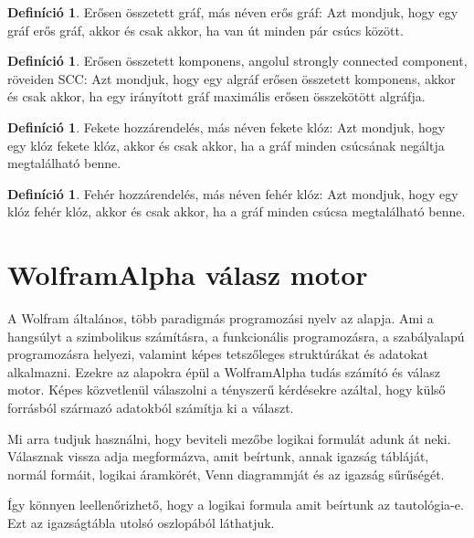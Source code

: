 \documentclass[
]{thesis-ekf}
\theoremstyle{definition}
\newtheorem{definicio}[tetel]{Definíció}
\theoremstyle{remark}
\begin{document}
	\begin{definicio}
		Erősen összetett gráf, más néven erős gráf: Azt mondjuk, hogy egy gráf erős gráf, akkor és csak akkor, ha van út minden pár csúcs között.
	\end{definicio}
	
	\begin{definicio}
		Erősen összetett komponens, angolul strongly connected component, röveiden SCC: Azt mondjuk, hogy egy algráf erősen összetett komponens, akkor és csak akkor, ha egy irányított gráf maximális erősen összekötött algráfja. 
	\end{definicio}
	
	\begin{definicio}
		Fekete hozzárendelés, más néven fekete klóz: Azt mondjuk, hogy egy klóz fekete klóz, akkor és csak akkor, ha a gráf minden csúcsának negáltja megtalálható benne.
	\end{definicio}
	
	\begin{definicio}
		Fehér hozzárendelés, más néven fehér klóz: Azt mondjuk, hogy egy klóz fehér klóz, akkor és csak akkor, ha a gráf minden csúcsa megtalálható benne.
	\end{definicio}

	
	
	\section{WolframAlpha válasz motor}\label{wolframalpha}
	A Wolfram általános, több paradigmás programozási nyelv az alapja. Ami a hangsúlyt a szimbolikus számításra, a funkcionális programozásra, a szabályalapú programozásra helyezi, valamint képes tetszőleges struktúrákat és adatokat alkalmazni. Ezekre az alapokra épül a WolframAlpha tudás számító és válasz motor. Képes közvetlenül válaszolni a tényszerű kérdésekre azáltal, hogy külső forrásból származó adatokból számítja ki a választ.
	
	Mi arra tudjuk használni, hogy beviteli mezőbe logikai formulát adunk át neki. Válasznak vissza adja megformázva, amit beírtunk, annak igazság tábláját, normál formáit, logikai áramkörét, Venn diagrammját és az igazság sűrűségét.
	
	Így könnyen leellenőrizhető, hogy a logikai formula amit beírtunk az tautológia-e. Ezt az igazságtábla utolsó oszlopából láthatjuk.
	
\end{document}
